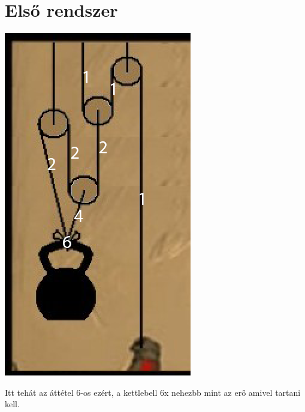 \documentclass{article}[12pt,a4paper]
\begin{document}
\section{Első rendszer}
\begin{center}
\includegraphics[scale=0.5]{1kettle}
\end{center}
Itt tehát az áttétel 6-os ezért, a kettlebell 6x nehezbb mint az erő amivel tartani kell.
\end{document}
